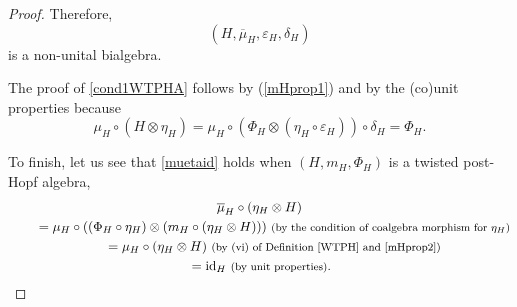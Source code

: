 \documentclass[pdftex]{sigma}
\numberwithin{equation}{section}
\begin{document}
\begin{proof}
Therefore,
\[
(H,\overline{\mu}_{H},\varepsilon_{H},\delta_{H})
\]
is a non-unital bialgebra.

The proof of \eqref{cond1WTPHA} follows by (\ref{mHprop1}) and by the (co)unit properties because
\[{\mu}_{H}\circ(H\otimes\eta_{H})=\mu_{H}\circ(\Phi_{H}\otimes(\eta_{H}\circ\varepsilon_{H}))\circ\delta_{H}=\Phi_{H}.\]

To finish, let us see that \eqref{muetaid} holds when $(H,m_{H},\Phi_{H})$ is a twisted post-Hopf algebra,
\begin{gather*}
 \overline{\mu}_{H}\circ(\eta_{H}\otimes H)\\
 \qquad{}= \mu_{H}\circ((\Phi_{H}\circ\eta_{H})\otimes(m_{H}\circ(\eta_{H}\otimes H)))\ \text{\footnotesize\textnormal{(by the condition of coalgebra morphism for $\eta_{H}$)}}\\
 \qquad{}= \mu_{H}\circ(\eta_{H}\otimes H)\ \text{\footnotesize\textnormal{(by (vi) of Definition \ref{WTPH} and \eqref{mHprop2})}}\\
 \qquad{}= {\rm id}_{H}\ \text{\footnotesize\textnormal{(by unit properties)}}. \tag*{\qed}
\end{gather*}
\renewcommand{\qed}{}
\end{proof}
\end{document}

